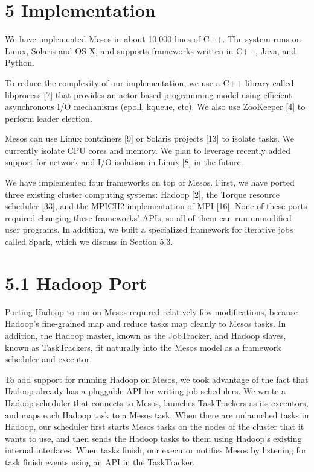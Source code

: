 \documentclass[
]{article}
\begin{document}
\section{5 Implementation}\label{implementation}

We have implemented Mesos in about 10,000 lines of C++. The system runs
on Linux, Solaris and OS X, and supports frameworks written in C++,
Java, and Python.

To reduce the complexity of our implementation, we use a C++ library
called libprocess {[}7{]} that provides an actor-based programming model
using efficient asynchronous I/O mechanisms (epoll, kqueue, etc). We
also use ZooKeeper {[}4{]} to perform leader election.

Mesos can use Linux containers {[}9{]} or Solaris projects {[}13{]} to
isolate tasks. We currently isolate CPU cores and memory. We plan to
leverage recently added support for network and I/O isolation in Linux
{[}8{]} in the future.

We have implemented four frameworks on top of Mesos. First, we have
ported three existing cluster computing systems: Hadoop {[}2{]}, the
Torque resource scheduler {[}33{]}, and the MPICH2 implementation of MPI
{[}16{]}. None of these ports required changing these frameworks' APIs,
so all of them can run unmodified user programs. In addition, we built a
specialized framework for iterative jobs called Spark, which we discuss
in Section 5.3.

\section{5.1 Hadoop Port}\label{hadoop-port}

Porting Hadoop to run on Mesos required relatively few modifications,
because Hadoop's fine-grained map and reduce tasks map cleanly to Mesos
tasks. In addition, the Hadoop master, known as the JobTracker, and
Hadoop slaves, known as TaskTrackers, fit naturally into the Mesos model
as a framework scheduler and executor.

To add support for running Hadoop on Mesos, we took advantage of the
fact that Hadoop already has a pluggable API for writing job schedulers.
We wrote a Hadoop scheduler that connects to Mesos, launches
TaskTrackers as its executors, and maps each Hadoop task to a Mesos
task. When there are unlaunched tasks in Hadoop, our scheduler first
starts Mesos tasks on the nodes of the cluster that it wants to use, and
then sends the Hadoop tasks to them using Hadoop's existing internal
interfaces. When tasks finish, our executor notifies Mesos by listening
for task finish events using an API in the TaskTracker.
\end{document}
